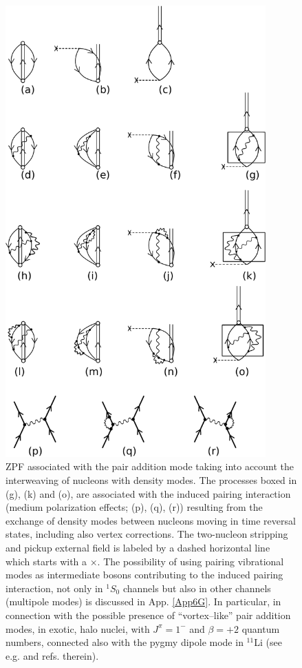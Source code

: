 \begin{figure}[h!]
\centerline {
\includegraphics*[width=10cm]{introduccion/figs/figintroA3}
}
\caption{ZPF associated with the pair addition mode taking into account the interweaving of nucleons with density modes. The processes boxed in (g), (k) and (o), are associated with the induced pairing interaction (medium polarization effects; (p), (q), (r)) resulting from the exchange of density modes between nucleons moving in time reversal states, including also vertex corrections. The two-nucleon stripping and pickup external field is labeled by a dashed horizontal line which starts with a $\times$. The possibility of using pairing vibrational modes as intermediate bosons contributing to the induced pairing interaction, not only in $^1S_0$ channels but also in other channels (multipole modes) is discussed in App. \ref{App6G}. In particular, in connection with the possible presence of ``vortex--like'' pair addition modes, in exotic, halo nuclei, with $J^\pi=1^-$ and $\beta=+2$ quantum numbers, connected also with the pygmy dipole mode in $^{11}$Li (see e.g. \cite{Broglia:19} and refs. therein).}
\label{figintroA3}
\end{figure}
\clearpage

